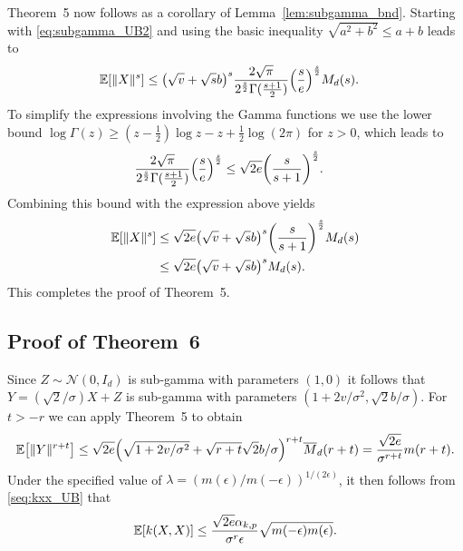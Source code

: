 \documentclass{article}
\theoremstyle{definition}
\newcommand{\ex}[1]{\ensuremath{\mathbb{E}\left[ #1\right]}}
\newcommand{\normal}{\mathcal{N}}
\newcommand{\eps}{\epsilon}
\let\originalleft\left
\let\originalright\right
\renewcommand{\left}{\mathopen{}\mathclose\bgroup\originalleft}
\renewcommand{\right}{\aftergroup\egroup\originalright}
\newcommand{\xc}[1]{\textcolor{orange}{\textsf{XC: #1}}}
\begin{document}
Theorem~5 now follows as a corollary of Lemma~\ref{lem:subgamma_bnd}. Starting with \eqref{eq:subgamma_UB2} and using the basic inequality $\sqrt{ a^2 + b^2} \le a + b$ leads to  
\begin{align*}
\ex{ \|X\|^s}& \le
\left(  \sqrt{v}   + \sqrt{s} b  \right)^s \frac{2  \sqrt{ \pi} }{2^\frac{s}{2} \Gamma( \frac{s+1}{2} ) } \left(\frac{s}{  e} \right)^\frac{s}{2} M_d(s).
\end{align*} 
To simplify the expressions involving the Gamma functions we use  the lower bound $\log \Gamma(z) \ge (z -\frac{1}{2}) \log z  - z + \frac{1}{2} \log(2 \pi)$ for $z >0$, which leads to 
\begin{align*}
 \frac{2  \sqrt{ \pi} }{2^\frac{s}{2} \Gamma( \frac{s+1}{2} ) } \left(\frac{s}{  e} \right)^\frac{s}{2} %
 &\le \sqrt{2e}     \left( \frac{s}{s+1} \right)^\frac{s}{2}.
\end{align*}
Combining this bound with the expression above yields
\begin{align*}
\ex{ \|X\|^s}  & \le \sqrt{ 2 e}   \left(  \sqrt{v}   + \sqrt{s} b  \right)^s \left( \frac{s}{s + 1} \right)^\frac{s}{2} M_d(s)\\
 & \le  \sqrt{2 e }  \left( \sqrt{v}   + \sqrt{s} b  \right)^s    M_d(s).
  \end{align*} 
This completes the proof of Theorem~5. 
 
 
\subsection{Proof of Theorem~6} 

Since $Z \sim \normal(0,I_d)$ is sub-gamma with parameters $(1,0)$ it follows that  $Y =( \sqrt{2}/\sigma) X + Z$ is sub-gamma with parameters $(1 + 2 v/ \sigma^2, \sqrt{2} b/\sigma)$. For $t > -r$ we can apply   Theorem~5 to obtain
\begin{align*}
    \ex{ \|Y\|^{r+t}} \le \sqrt{2 e} \left(  \sqrt{1 + 2 v/\sigma^2} + \sqrt{r + t} \sqrt{2} b/\sigma \right)^{r +t}  \overline{M}_d(r +t) = \frac{\sqrt{2 e}}{\sigma^{r+t}}m(r+t) .
\end{align*}
Under the specified value of $\lambda = (m(\eps)/m(-\eps))^{1/(2 \eps)}$, it then follows from \eqref{seq:kxx_UB} that
\begin{align}
\ex{ k(X,X) } \le  \frac{ \sqrt{2 e}  \alpha_{k,p}  }{ \sigma^r \eps}   \sqrt{m(-\eps)  m(\eps) }. \label{seq:kxx_meps}
\end{align}
\end{document}
